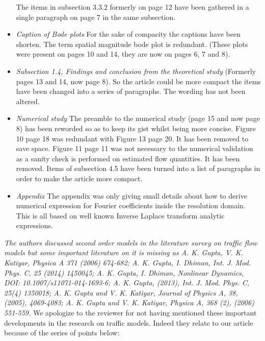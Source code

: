 \documentclass{article}
\begin{document}
\begin{itemize}
The items in subsection 3.3.2 formerly on page 12 have been gathered in a single paragraph on page 7 in the same subsection. 

\item
\emph{Caption of Bode plots}
For the sake of compacity the captions have been shorten. The term spatial magnitude bode plot is redundant. (These plots were present on pages 10 and 14, they are now on pages 6, 7 and 8).

\item
\emph{Subsection 1.4, Findings and conclusion from the theoretical study}
(Formerly pages 13 and 14, now page 8). So the article could be more compact the items have been changed into a series of paragraphs. The wording has not been altered.

\item
\emph{Numerical study}
The preamble to the numerical study (page 15 and now page 8) has been reworded so as to keep its gist whilst being more concise.
Figure 10 page 18 was redundant with Figure 13 page 20. It has been removed to save space.
Figure 11 page 11 was not necessary to the numerical validation as a sanity check is performed on estimated flow quantities. It has been removed.
Items of subsection 4.5 have been turned into a list of paragraphs in order to make the article more compact.

\item
\emph{Appendix}
The appendix was only giving small details about how to derive numerical expression for Fourier coefficients inside the resolution domain. This is all based on well known Inverse Laplace transform analytic expressions.

\end{itemize}

\bigskip{}

\emph{
The authors discussed second order models in the literature survey on traffic flow models but some important literature on it is missing as A. K. Gupta, V. K. Katiyar, Physica A 371 (2006) 674-682;  A. K. Gupta, I. Dhiman, Int. J. Mod. Phys. C, 25 (2014) 1450045; A. K. Gupta, I. Dhiman, Nonlinear Dynamics, DOI: 10.1007/s11071-014-1693-6; A. K. Gupta, (2013), Int. J. Mod. Phys. C, 25(4) 1350018; A. K. Gupta and V. K. Katiyar, Journal of Physics A, 38, (2005), 4069-4083; A. K. Gupta and V. K. Katiyar, Physica A, 368 (2), (2006) 551-559.
}
We apologize to the reviewer for not having mentioned these important developments in the research on traffic models. Indeed they relate to our article because of the series of points below:
\end{document}
